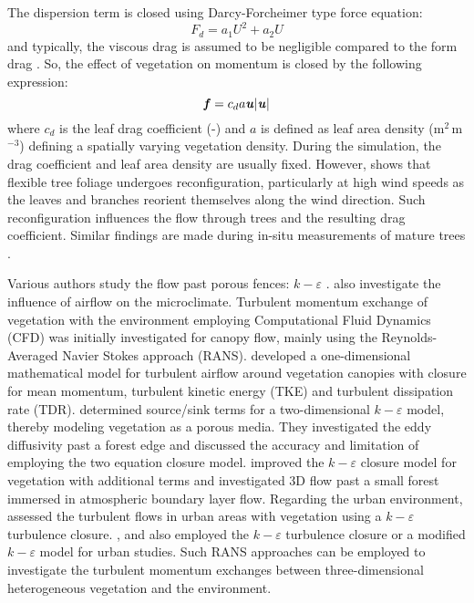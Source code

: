 The dispersion term is closed using Darcy-Forcheimer type force equation: 
\begin{equation}
F_{d} =  a_1 U^2 + a_2 U 
\end{equation}
and typically, the viscous drag is assumed to be negligible compared to the form drag \citep{Raupach1981, Sanz2003}. So, the effect of vegetation on momentum is closed by the following expression:
\begin{equation}
\textbf{\textit{f}} = c_d a \textbf{\textit{u}}|\textbf{\textit{u}}|
\end{equation}
where $c_d$ is the leaf drag coefficient (-) and $a$ is defined as leaf area density (m$^2$\,m$^{-3}$) defining a spatially varying vegetation density. During the simulation, the drag coefficient and leaf area density are usually fixed. However, \cite{DeLangre2012} shows that flexible tree foliage undergoes reconfiguration, particularly at high wind speeds as the leaves and branches reorient themselves along the wind direction. Such reconfiguration influences the flow through trees and the resulting drag coefficient. Similar findings are made during in-situ measurements of mature trees \citep{Grant1998,Kane2006,Koizumi2016}.

Various authors study the flow past porous fences: $k-\varepsilon$ \citep{Packwood2000, Bourdin2008}. \cite{Cleugh1998} also investigate the influence of airflow on the microclimate. Turbulent momentum exchange of vegetation with the environment employing Computational Fluid Dynamics (CFD) was initially investigated for canopy flow, mainly using the Reynolds-Averaged Navier Stokes approach (RANS). \cite{Wilson1977} developed a one-dimensional mathematical model for turbulent airflow around vegetation canopies with closure for mean momentum, turbulent kinetic energy (TKE) and turbulent dissipation rate (TDR).  \cite{Liu1996} determined source/sink terms for a two-dimensional $k-\varepsilon$ model, thereby modeling vegetation as a porous media. They investigated the eddy diffusivity past a forest edge and discussed the accuracy and limitation of employing the two equation closure model. \cite{Liang2006} improved the  $k-\varepsilon$ closure model for vegetation with additional terms and investigated 3D flow past a small forest immersed in atmospheric boundary layer flow. Regarding the urban environment, \cite{Kenjeres2013} assessed the turbulent flows in urban areas with vegetation using a $k-\varepsilon$ turbulence closure. \cite{Bruse1998}, \cite{Robitu2006} and \cite{Gromke2015c} also employed the  $k-\varepsilon$ turbulence closure or a modified  $k-\varepsilon$ model for urban studies. Such RANS approaches can be employed to investigate the turbulent momentum exchanges between three-dimensional heterogeneous vegetation and the environment. 

